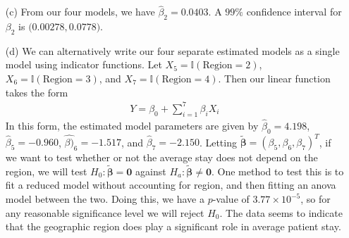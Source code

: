 \documentclass[10pt]{article}
\begin{document}
\begin{itemize}
    \item[(c)] From our four models, we have \(\hat{\beta}_2 = 0.0403\). A \(99\%{}\) confidence interval for \(\beta_2\) is 
    \(\big( 0.00278, 0.0778 \big)\). 
    \item[(d)] We can alternatively write our four separate estimated models as a single model using indicator functions. Let 
    \(X_5 = \mathbb{I}(\text{Region} = 2)\), \(X_6 = \mathbb{I}(\text{Region} = 3)\), and \(X_7 = \mathbb{I}(\text{Region} = 4)\).
    Then our linear function takes the form 
    \begin{align}
        Y = \beta_0 + \sum_{i = 1}^7 \beta_i X_i \label{mod-region-whole}
    \end{align}
    In this form, the estimated model parameters are given by \(\hat{\beta}_0 = 4.198\), \(\hat{\beta}_5 = - 0.960\), \(\hat{\beta)}_6 = -1.517\), and 
    \(\hat{\beta}_7 = -2.150\). Letting \(\tilde{\bm{\beta}} = (\beta_5, \beta_6, \beta_7)^T\), if we want to test whether or not the average stay does not 
    depend on the region, we will test \(H_0 : \tilde{\bm{\beta}} = \mathbf{0}\) against \(H_a : \tilde{\bm{\beta}} \neq \mathbf{0}\). One method to test this 
    is to fit a reduced model without accounting for region, and then fitting an anova model between the two. Doing this, we have a \(p\)-value of 
    \(3.77 \times 10^{-5}\), so for any reasonable significance level we will reject \(H_0\). The data seems to indicate that the geographic region does play 
    a significant role in average patient stay. 
\end{itemize}


\end{document}
